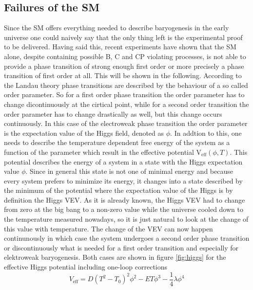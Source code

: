 \subsection{Failures of the SM}
Since the SM offers everything needed to describe baryogenesis in the early universe one could naively say that the only thing left is the experimental proof to be delivered. \newline
Having said this, recent experiments have shown that the SM alone, despite containing possible B, C and CP violating processes, is not able to provide a phase transition of strong enough first order or more precisely a phase transition of first order at all. This will be shown in the following. \newline
According to the Landau theory phase transitions are described by the behaviour of a so called order parameter. So for a first order phase transition the order parameter has to change dicontinuously at the cirtical point, while for a second order transition the order parameter has to change drastically as well, but this change occurs continuously. In this case of the electroweak phase transition the order parameter is the expectation value of the Higgs field, denoted as $\phi$. In addtion to this, one needs to describe the temperature dependent free energy of the system as a function of the parameter which result in the effective potential V$_\text{eff}(\phi,T)$. This potential describes the energy of a system in a state with the Higgs expectation value $\phi$. Since in general this state is not one of minimal energy and because every system prefers to minimize its energy, it changes into a state described by the minimum of the potential where the expectation value of the Higgs is by definition the Higgs VEV. \newline
As it is already known, the Higgs VEV had to change from zero at the big bang to a non-zero value while the universe cooled down to the temperature measured nowadays, so it is just natural to look at the change of this value with temperature. The change of the VEV can now happen continunously in which case the system undergoes a second order phase transition or discontinuously what is needed for a first order transition and especially for elektroweak baryogenesis. 
Both cases are shown in figure \ref{fig:higgs} for the effective Higgs potential including one-loop corrections \cite{Petropoulos:2003pm}
\begin{equation}
	V_\text{eff}=D(T^2-T_0)^2\phi^2-ET\phi^3-\frac{1}{4}\lambda\phi^4
	\label{effective_pot}
\end{equation}
